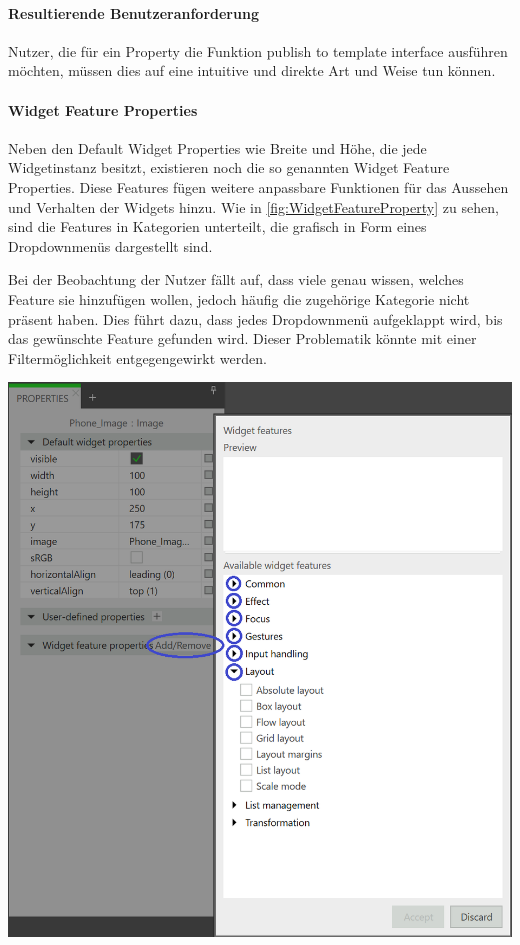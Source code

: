 \paragraph{Resultierende Benutzeranforderung}
Nutzer, die für ein Property die Funktion \glqq publish to template interface\grqq{} ausführen möchten, müssen dies auf eine intuitive und direkte Art und Weise tun können.

\paragraph{Widget Feature Properties}

Neben den Default Widget Properties wie Breite und Höhe, die jede Widgetinstanz besitzt, existieren noch die so genannten Widget Feature Properties.
Diese Features fügen weitere anpassbare Funktionen für das Aussehen und Verhalten der Widgets hinzu.
Wie in \cref{fig:WidgetFeatureProperty} zu sehen, sind die Features in Kategorien unterteilt, die grafisch in Form eines Dropdownmenüs dargestellt sind.

Bei der Beobachtung der Nutzer fällt auf, dass viele genau wissen, welches Feature sie hinzufügen wollen, jedoch häufig die zugehörige Kategorie nicht präsent haben.
Dies führt dazu, dass jedes Dropdownmenü aufgeklappt wird, bis das gewünschte Feature gefunden wird.
Dieser Problematik könnte mit einer Filtermöglichkeit entgegengewirkt werden.

\begin{center}
  \includegraphics[scale=0.5]{figures/WidgetFeatureProperty.png}
  \label{fig:WidgetFeatureProperty}
\end{center}

